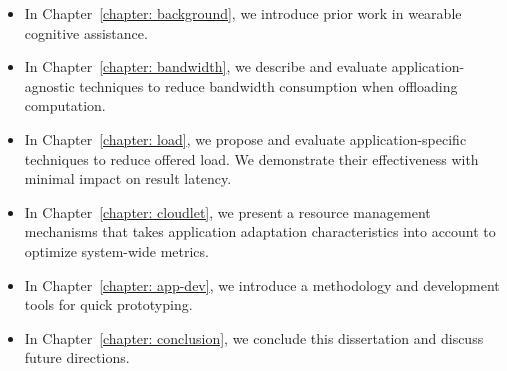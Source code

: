 \begin{itemize}
  \item{In Chapter~\ref{chapter: background}, we introduce prior work in wearable cognitive assistance.}
  \item{In Chapter~\ref{chapter: bandwidth}, we describe and evaluate application-agnostic techniques to reduce bandwidth consumption when offloading computation.}
  \item{In Chapter~\ref{chapter: load}, we propose and evaluate 
  application-specific techniques to reduce offered load. 
  We demonstrate their effectiveness 
  with minimal impact on result latency.}
  \item{In Chapter~\ref{chapter: cloudlet}, we present a resource management
  mechanisms that takes application adaptation characteristics into account to
  optimize system-wide metrics.}
  \item{In Chapter~\ref{chapter: app-dev}, we introduce a methodology and
  development tools for quick prototyping.}
  \item{In Chapter~\ref{chapter: conclusion}, we conclude this dissertation and discuss future directions.}
\end{itemize}